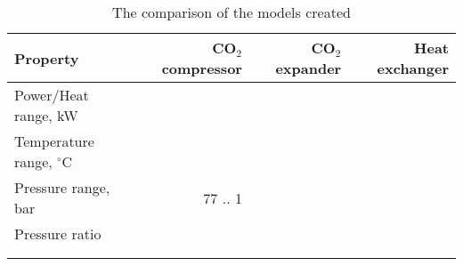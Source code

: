 \begin{table}
\label{tab:DiscussionComparison}
\caption{The comparison of the models created}
\begin{center}
\begin{tabulary}{0.9\textwidth}{LRRR}
\toprule
Property    	                &	CO$_2$ compressor   & CO$_2$	expander    & Heat exchanger    \\
\midrule
Power/Heat range, kW            &                       &                       &                   \\
Temperature range, $^\circ$C    &                       &                       &                   \\
Pressure range, bar             &   77 .. 1             &                       &                   \\
Pressure ratio                  &                       &                       &                   \\
& & & \\
& & & \\
\bottomrule
\end{tabulary}
\end{center}
\end{table}